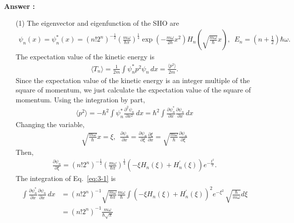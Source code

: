 \documentclass[floatfix,nofootinbib,superscriptaddress,fleqn]{revtex4-2}
\begin{document}
\noindent \textbf{Answer : }
\begin{itemize}
  \item[(1)] The eigenvector and eigenfunction of the SHO are
  \begin{align}\label{eq:3}
    \psi_n(x)=\psi^*_n(x)= (n!2^n)^{-\frac{1}{2}}
    \left(\frac{m\omega}{\hbar\pi}\right)^{\frac{1}{4}}
    \exp\left(-\frac{m\omega}{2\hbar}x^2\right)
    H_n\left(\sqrt{\frac{m\omega}{\hbar}}x\right),\,\,\,
    E_n=\left( n+\frac{1}{2} \right)\hbar\omega.
  \end{align}
  The expectation value of the kinetic energy is
  \begin{align}
   \langle T_n\rangle = \frac{1}{2m}\int \psi^*_n p^2 
   \psi_n\,dx
   =\frac{\langle p^2\rangle}{2m}.
  \end{align}
  Since the expectation value of the kinetic energy is 
  an integer multiple of the square of momentum, we just 
  calculate the expectation value of the 
  square of momentum. Using the integration by part,
  \begin{align}\label{eq:3-1}
    \langle p^2\rangle = -\hbar^2\int \psi^*_n 
    \frac{\partial^2 \psi_n}{\partial x^2} \,dx
    =\hbar^2\int\frac{\partial \psi^*_n}{\partial x} 
    \frac{\partial \psi_n}{\partial x} \,dx
  \end{align}
  Changing the variable,
  \begin{align}\label{eq:3-2}
    \sqrt{\frac{m\omega}{\hbar}}x = \xi,\,\,\,
    \frac{\partial \psi_n}{\partial x}
    =\frac{\partial \psi_n}{\partial \xi}
    \frac{\partial \xi}{\partial x}
    =\sqrt{\frac{m\omega}{\hbar}}
    \frac{\partial \psi_n}{\partial \xi}
  \end{align}  
  Then,
  \begin{align}
    \frac{\partial \psi_n}{\partial \xi}
    =(n!2^n)^{-\frac{1}{2}}
    \left(\frac{m\omega}{\hbar\pi}\right)^{\frac{1}{4}}
    (-\xi H_n\left(\xi\right) 
    +H^\prime_n\left(\xi\right))
    e^{-\frac{\xi^2}{2}}.
  \end{align}
  The integration of Eq.~\eqref{eq:3-1} is
  \begin{align}
    \begin{split}
      \int\frac{\partial \psi^*_n}{\partial x} 
      \frac{\partial \psi_n}{\partial x} \,dx
      &= (n!2^n)^{-1}\sqrt{\frac{m\omega}{\hbar\pi}}
      \frac{m\omega}{\hbar}\int(-\xi H_n\left(\xi\right) 
      +H^\prime_n\left(\xi\right))^2 e^{-\xi^2}\,
      \sqrt{\frac{\hbar}{m\omega}}d\xi  \\
      &= (n!2^n)^{-1}\frac{m\omega}{\hbar\sqrt{\pi}}

\end{split}
\end{align}
\end{itemize}
\end{document}
